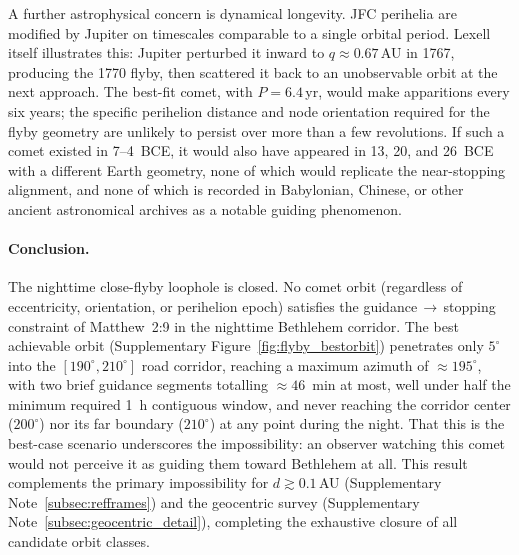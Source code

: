 \documentclass[11pt,a4paper]{article}
\begin{document}
A further astrophysical concern is dynamical longevity. JFC perihelia are modified
by Jupiter on timescales comparable to a single orbital period. Lexell itself
illustrates this: Jupiter perturbed it inward to $q \approx 0.67$\,AU in 1767,
producing the 1770 flyby, then scattered it back to an unobservable orbit at the
next approach. The best-fit comet, with $P = 6.4$\,yr, would make apparitions
every six years; the specific perihelion distance and node orientation required for
the flyby geometry are unlikely to persist over more than a few revolutions.
If such a comet existed in 7--4~BCE, it would also have appeared in 13, 20,
and 26~BCE with a different Earth geometry, none of which would replicate the
near-stopping alignment, and none of which is recorded in Babylonian, Chinese,
or other ancient astronomical archives as a notable guiding phenomenon.

\paragraph{Conclusion.}
The nighttime close-flyby loophole is closed. No comet orbit (regardless of
eccentricity, orientation, or perihelion epoch) satisfies the
guidance\,$\to$\,stopping constraint of Matthew~2:9 in the nighttime Bethlehem
corridor. The best achievable orbit (Supplementary Figure~\ref{fig:flyby_bestorbit}) penetrates only
$5^\circ$ into the $[190^\circ, 210^\circ]$ road corridor, reaching a maximum
azimuth of $\approx\!195^\circ$, with two brief guidance segments totalling
$\approx\!46$~min at most, well under half the minimum required 1~h contiguous
window, and never reaching the corridor center ($200^\circ$) nor its far
boundary ($210^\circ$) at any point during the night. That this is the best-case scenario underscores the
impossibility: an observer watching this comet would not perceive it as guiding
them toward Bethlehem at all. This result complements the primary impossibility
for $d \gtrsim 0.1$\,AU (Supplementary Note~\ref{subsec:refframes}) and the geocentric survey (Supplementary Note~\ref{subsec:geocentric_detail}),
completing the exhaustive closure of all candidate orbit classes.
\end{document}
